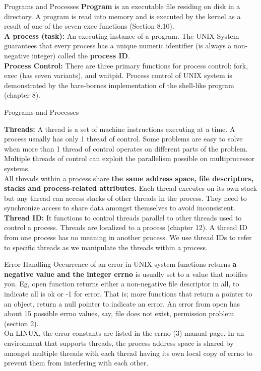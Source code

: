 \documentclass[newPxFont,sthlmFooter,nooffset]{beamer}
\begin{document}
\begin{frame}[t]{Programs and Processes}
\textbf{Program} is an executable file residing on disk in a directory. A program is read into memory and is executed by the kernel as a result of one of the seven exec functions (Section 8.10).\\[10pt]
\textbf{A process (task):} An executing instance of a program. 
The UNIX System guarantees that every process has a unique numeric identifier (is always a non-negative integer) called the \textbf{process ID}. 
\\[6pt]\textbf{Process Control:}  There are three primary functions for process control: fork, exec (has seven variants), and waitpid. Process control of UNIX system is demonstrated by the bare-bornes implementation of the shell-like program (chapter 8). 

\end{frame}

\begin{frame}[t]{Programs and Processes}
\subtitle{Threads and Threads ID}
\textbf{Threads:} A thread is a set of machine instructions executing at a time. A process usually has only 1 thread of control. Some problems are easy to solve when more than 1 thread of control operates on different parts of the problem. Multiple threads of control can exploit the parallelism possible on multiprocessor systems.
\\[6pt]All threads within a process share \textbf{the same address space, file descriptors, stacks and process-related attributes.} Each thread executes on its own stack but any thread can access stacks of other threads in the process. They need to synchronize access to share data amongst themselves to avoid inconsistent.
\\[4pt]\textbf{Thread ID:} It functions to control threads parallel to other threads used to control a process. Threads are localized to a process (chapter 12). A thread ID from one process has no meaning in another process. We use thread IDs to refer to specific threads as we manipulate the threads within a process.

\end{frame}

\begin{frame}[t]{Error Handling}
Occurrence of an error in UNIX system functions returns \textbf{a negative value and the integer errno} is usually set to a value that notifies you. Eg, open function returns either a non-negative file descriptor in all, to indicate all is ok or -1 for error. That is; more functions that return a pointer to an object, return a null pointer to indicate an error. An error from open has about 15 possible errno values, say, file does not exist, permission problem (section 2).
\\[6pt]On LINUX, the error constants are listed in the errno (3) manual page. In an environment that supports threads, the process address space is shared by amongst multiple threads with each thread having its own local copy of errno to prevent them from interfering with each other. 


\end{frame}
\end{document}
